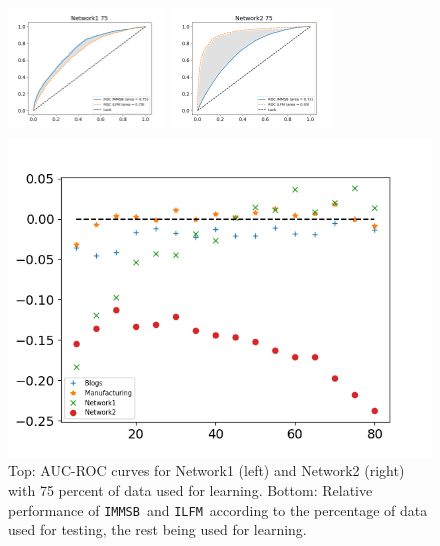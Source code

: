 \documentclass[9pt,twocolumn,twoside]{pnas-new}
\newcommand{\ifm}{\texttt{ILFM}}
\newcommand{\imb}{\texttt{IMMSB}}
\begin{document}
\begin{figure}[h]
\centering
    \begin{minipage}{0.24\textwidth}
        \includegraphics[width=4.22cm,height=3.5cm]{img/corpus/roc_network1_75_f}
    \end{minipage}
    \begin{minipage}{0.24\textwidth}
        \includegraphics[width=4.22cm,height=3.5cm]{img/corpus/roc_network2_75_f}
    \end{minipage}
    \begin{minipage}{0.4\textwidth}
        \includegraphics[width=\textwidth]{img/corpus/testset_max_20.png}
    \end{minipage}
    \caption{Top: AUC-ROC curves for Network1 (left) and Network2 (right) with 75 percent of data used for learning. Bottom: Relative performance of \imb\ and \ifm\ according to the percentage of data used for testing, the rest being used for learning.} 
\label{fig:auc}
\end{figure}
\end{document}
